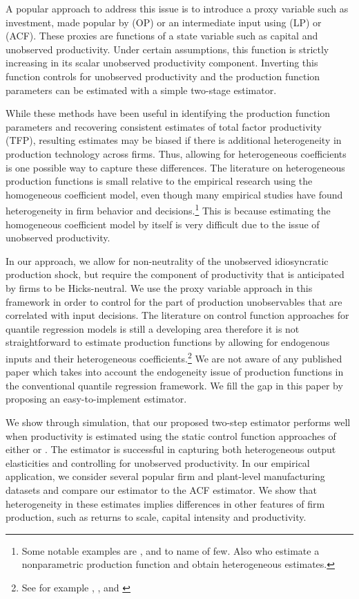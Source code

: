 \documentclass[11pt]{article}
\begin{document}
A popular approach to address this issue is to introduce a proxy variable such as investment, made popular by \cite{Olley1996} (OP) or an intermediate input using \cite{Levinsohn2003} (LP) or \cite{Ackerberg2015} (ACF). These proxies are functions of a state variable such as capital and unobserved productivity. Under certain assumptions, this function is strictly increasing in its scalar unobserved productivity component. Inverting this function controls for unobserved productivity and the production function parameters can be estimated with a simple two-stage estimator.

While these methods have been useful in identifying the production function parameters and recovering consistent estimates of total factor productivity (TFP), resulting estimates may be biased if there is additional heterogeneity in production technology across firms. Thus, allowing for heterogeneous coefficients is one possible way to capture these differences. The literature on heterogeneous production functions is small relative to the empirical research using the homogeneous coefficient model, even though many empirical studies have found heterogeneity in firm behavior and decisions.\footnote{Some notable examples are \cite*{Kasahara2015}, \cite*{balat} and \cite*{Li2017} to name of few. Also \cite{Gandhi2020} who estimate a nonparametric production function and obtain heterogeneous estimates.} This is because estimating the homogeneous coefficient model by itself is very difficult due to the issue of unobserved productivity. 

In our approach, we allow for non-neutrality of the unobserved idiosyncratic production shock, but require the component of productivity that is anticipated by firms to be Hicks-neutral.  We use the proxy variable approach in this framework in order to control for the part of production unobservables that are correlated with input decisions. The literature on control function approaches for quantile regression models is still a developing area therefore it is not straightforward to estimate production functions by allowing for endogenous inputs and their heterogeneous coefficients.\footnote{See for example \cite{Chesher2003}, \cite{Ma2006}, \cite{Lee2007} and \cite{2009a}} We are not aware of any published paper which takes into account the endogeneity issue of production functions in the conventional quantile regression framework. We fill the gap in this paper by proposing an easy-to-implement estimator.

We show through simulation, that our proposed two-step estimator performs well when productivity is estimated using the static control function approaches of either \cite{Levinsohn2003} or \cite{Ackerberg2015}. The estimator is successful in capturing  both heterogeneous output elasticities and controlling for unobserved productivity. In our empirical application, we consider several popular firm and plant-level manufacturing datasets and compare our estimator to the ACF estimator. We show that heterogeneity in these estimates implies differences in other features of firm production, such as returns to scale, capital intensity and productivity.
\end{document}
